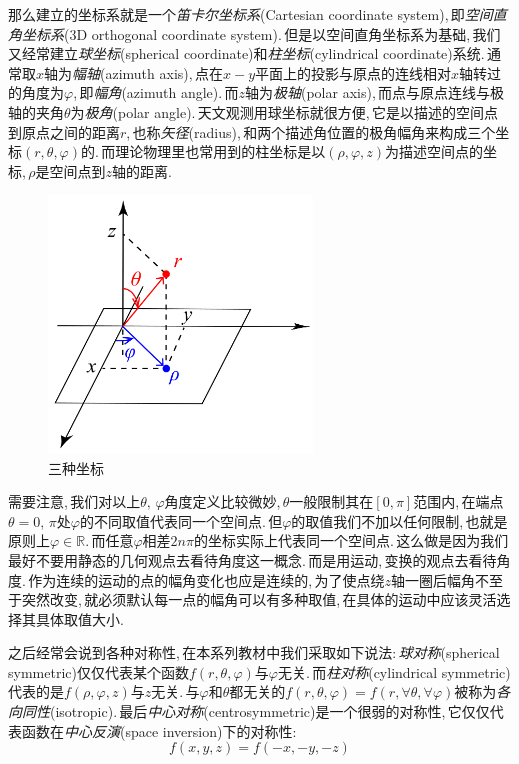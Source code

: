那么建立的坐标系就是一个\emph{笛卡尔坐标系}(Cartesian coordinate system),\,即\emph{空间直角坐标系}(3D orthogonal coordinate system).\,但是以空间直角坐标系为基础,\,我们又经常建立\emph{球坐标}(spherical coordinate)和\emph{柱坐标}(cylindrical coordinate)系统.\,通常取$x$轴为\emph{幅轴}(azimuth axis),\,点在$x-y$平面上的投影与原点的连线相对$x$轴转过的角度为$\varphi$,\,即\emph{幅角}(azimuth angle).\,而$z$轴为\emph{极轴}(polar axis),\,而点与原点连线与极轴的夹角$\theta$为\emph{极角}(polar angle).\,天文观测用球坐标就很方便,\,它是以描述的空间点到原点之间的距离$r$,\,也称\emph{矢径}(radius),\,和两个描述角位置的极角幅角来构成三个坐标$(r,\theta,\varphi)$的.\,而理论物理里也常用到的柱坐标是以$(\rho,\varphi,z)$为描述空间点的坐标,\,$\rho$是空间点到$z$轴的距离.

\begin{figure}
\vspace{-0.4cm}
\centering
\includegraphics[width=7cm]{image/6-1-1.png}
\caption{三种坐标}
\end{figure}
需要注意,\,我们对以上$\theta,\,\varphi$角度定义比较微妙,\,$\theta$一般限制其在$[0,\pi]$范围内,\,在端点$\theta=0,\,\pi$处$\varphi$的不同取值代表同一个空间点.\,但$\varphi$的取值我们不加以任何限制,\,也就是原则上$\varphi\in\mathbb{R}$.\,而任意$\varphi$相差$2n\pi$的坐标实际上代表同一个空间点.\,这么做是因为我们最好不要用静态的几何观点去看待角度这一概念.\,而是用运动,\,变换的观点去看待角度.\,作为连续的运动的点的幅角变化也应是连续的,\,为了使点绕$z$轴一圈后幅角不至于突然改变,\,就必须默认每一点的幅角可以有多种取值,\,在具体的运动中应该灵活选择其具体取值大小.

之后经常会说到各种对称性,\,在本系列教材中我们采取如下说法:\,\emph{球对称}(spherical symmetric)仅仅代表某个函数$f(r,\theta,\varphi)$与$\varphi$无关.\,而\emph{柱对称}(cylindrical symmetric)代表的是$f(\rho,\varphi,z)$与$z$无关.\,与$\varphi$和$\theta$都无关的$f(r,\theta,\varphi)=f(r,\forall\theta,\forall\varphi)$被称为\emph{各向同性}(isotropic).\,最后\emph{中心对称}(centrosymmetric)是一个很弱的对称性,\,它仅仅代表函数在\emph{中心反演}(space inversion)下的对称性:
\[f(x,y,z)=f(-x,-y,-z)\]

